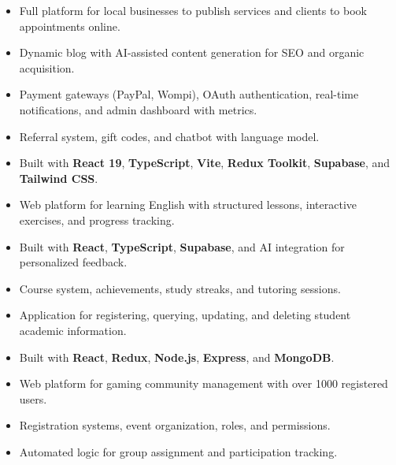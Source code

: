 \documentclass[11pt, a4paper]{awesome-cv}
\begin{document}
\divider

\begin{itemize}
  \item Full platform for local businesses to publish services and clients to book appointments online.
  \item Dynamic blog with AI-assisted content generation for SEO and organic acquisition.
  \item Payment gateways (PayPal, Wompi), OAuth authentication, real-time notifications, and admin dashboard with metrics.
  \item Referral system, gift codes, and chatbot with language model.
  \item Built with \textbf{React 19}, \textbf{TypeScript}, \textbf{Vite}, \textbf{Redux Toolkit}, \textbf{Supabase}, and \textbf{Tailwind CSS}.
\end{itemize}

\divider

\begin{itemize}
  \item Web platform for learning English with structured lessons, interactive exercises, and progress tracking.
  \item Built with \textbf{React}, \textbf{TypeScript}, \textbf{Supabase}, and AI integration for personalized feedback.
  \item Course system, achievements, study streaks, and tutoring sessions.
\end{itemize}

\divider

\begin{itemize}
  \item Application for registering, querying, updating, and deleting student academic information.
  \item Built with \textbf{React}, \textbf{Redux}, \textbf{Node.js}, \textbf{Express}, and \textbf{MongoDB}.
\end{itemize}

\divider

\begin{itemize}
  \item Web platform for gaming community management with over 1000 registered users.
  \item Registration systems, event organization, roles, and permissions.
  \item Automated logic for group assignment and participation tracking.
\end{itemize}
\end{document}
